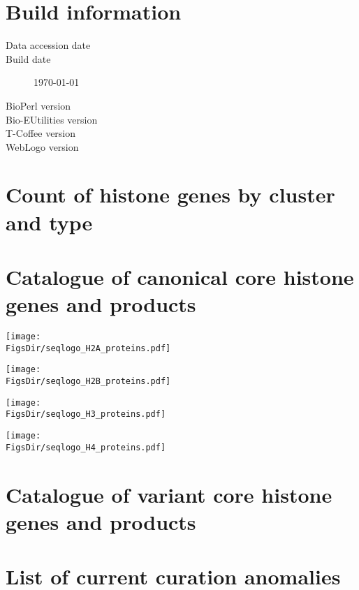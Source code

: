   \section{Build information}
  \begin{description}
    \item[Data accession date] \hfill \newline
      \printdate{\SequencesDate}
    \item[Build date] \hfill \newline
      \today
    \item[BioPerl version] \hfill \newline
      \BioPerlVersion{}
    \item[Bio-EUtilities version] \hfill \newline
      \BioEUtilitiesVersion
    \item[T-Coffee version] \hfill \newline
      \TCoffeVersion
    \item[WebLogo version] \hfill \newline
      \WebLogoVersion
  \end{description}

  \section{Count of histone genes by cluster and type}
  

  \newpage
  \section{Catalogue of canonical core histone genes and products}
  

  \newpage
  
  \texttt{[image: \\FigsDir/seqlogo\_H2A\_proteins.pdf]}

  \newpage
  
  \texttt{[image: \\FigsDir/seqlogo\_H2B\_proteins.pdf]}

  \newpage
  
  \texttt{[image: \\FigsDir/seqlogo\_H3\_proteins.pdf]}

  \newpage
  
  \texttt{[image: \\FigsDir/seqlogo\_H4\_proteins.pdf]}

  \newpage
  \section{Catalogue of variant core histone genes and products}
  

  \newpage
  \section{List of current curation anomalies}
  \begin{itemize}
  
  \end{itemize}
